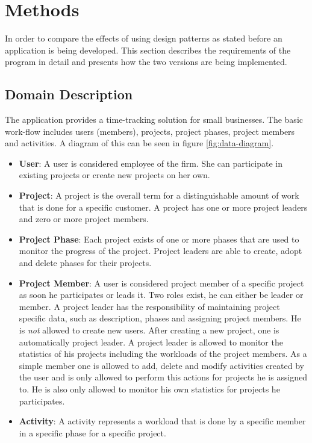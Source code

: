 \chapter{Methods}
In order to compare the effects of using design patterns as stated before an application is being developed. This section describes the requirements of the program in detail and presents how the two versions are being implemented.

\section{Domain Description}
The application provides a time-tracking solution for small businesses. The basic work-flow includes users (members), projects, project phases, project members and activities. A diagram of this can be seen in figure \ref{fig:data-diagram}.

\begin{itemize}
	\item \textbf{User}: A user is considered employee of the firm. She can participate in existing projects or create new projects on her own.
	\item \textbf{Project}: A project is the overall term for a distinguishable amount of work that is done for a specific customer. A project has one or more project leaders and zero or more project members.
	\item \textbf{Project Phase}: Each project exists of one or more phases that are used to monitor the progress of the project. Project leaders are able to create, adopt and delete phases for their projects. 
	\item \textbf{Project Member}: A user is considered project member of a specific project as soon he participates or leads it. Two roles exist, he can either be leader or member. A project leader has the responsibility of maintaining project specific data, such as description, phases and assigning project members. He is \emph{not} allowed to create new users. After creating a new project, one is automatically project leader. A project leader is allowed to monitor the statistics of his projects including the workloads of the project members. As a simple member one is allowed to add, delete and modify activities created by the user and is only allowed to perform this actions for projects he is assigned to. He is also only allowed to monitor his own statistics for projects he participates.
	\item \textbf{Activity}: A activity represents a workload that is done by a specific member in a specific phase for a specific project.
\end{itemize}

